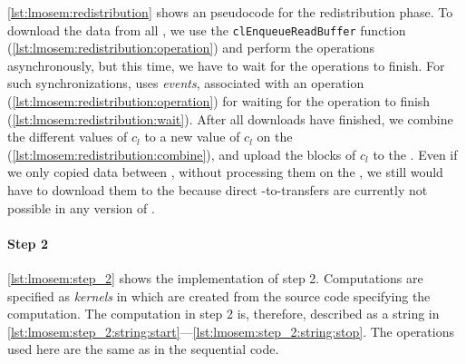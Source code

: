 \autoref{lst:lmosem:redistribution} shows an \OpenCL pseudocode for the redistribution phase.
To download the data from all \GPUs, we use the \texttt{clEnqueueReadBuffer} function (\autoref{lst:lmosem:redistribution:operation}) and perform the operations asynchronously, but this time, we have to wait for the operations to finish.
For such synchronizations, \OpenCL uses \emph{events}, associated with an operation (\autoref{lst:lmosem:redistribution:operation}) for waiting for the operation to finish (\autoref{lst:lmosem:redistribution:wait}).
After all downloads have finished, we combine the different values of $c_l$ to a new value of $c_l$ on the \CPU (\autoref{lst:lmosem:redistribution:combine}), and upload the blocks of $c_l$ to the \GPUs.
Even if we only copied data between \GPUs, without processing them on the \CPU, we still would have to download them to the \CPU because direct \GPU-to-\GPU transfers are currently not possible in any version of \OpenCL.

\paragraph{Step 2}
\autoref{lst:lmosem:step_2} shows the implementation of step 2.
Computations are specified as \emph{kernels} in \OpenCL which are created from the source code specifying the computation.
The computation in step 2 is, therefore, described as a string in \autoref{lst:lmosem:step_2:string:start}---\autoref{lst:lmosem:step_2:string:stop}.
The operations used here are the same as in the sequential code.

